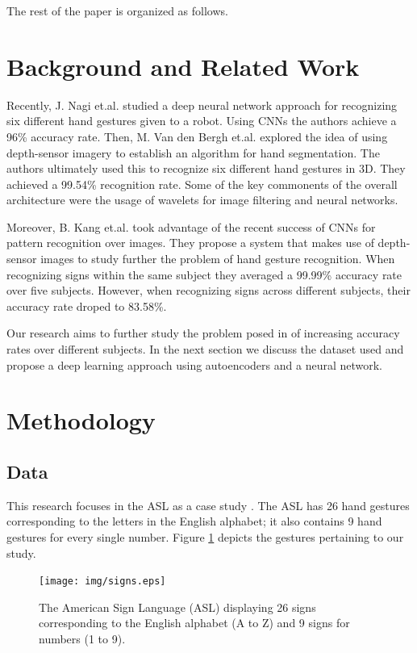 The rest of the paper is organized as follows. 


\section{Background and Related Work}

Recently, J. Nagi et.al. \cite{nagi2011max} studied a deep neural network
approach for recognizing six different hand gestures given to a robot. Using
CNNs the authors achieve a 96\% accuracy rate. Then, M. Van den Bergh et.al.
\cite{van2011combining} explored the idea of using depth-sensor imagery to
establish an algorithm for hand segmentation. The authors ultimately used this
to recognize six different hand gestures in 3D. They achieved a 99.54\%
recognition rate. Some of the key commonents of the overall architecture were
the usage of wavelets for image filtering and neural networks.

Moreover, B. Kang et.al. \cite{kang2015real} took advantage of the recent
success of CNNs for pattern recognition over images. They propose a system that
makes use of depth-sensor images to study further the problem of hand gesture
recognition. When recognizing signs within the same subject they averaged a 99.99\%
accuracy rate over five subjects. However, when recognizing signs across
different subjects, their accuracy rate droped to 83.58\%. 

Our research aims to further study the problem posed in \cite{kang2015real} of
increasing accuracy rates over different subjects. In the next section we
discuss the dataset used and propose a deep learning approach using
autoencoders and a neural network. 


\section{Methodology}

\subsection{Data}

This research focuses in the ASL as a case study \cite{baker1980american}. 
The ASL has 26 hand gestures 
corresponding to the letters in the English alphabet; it also contains 9 hand
gestures for every single number. Figure \ref{fig:asl} 
depicts the gestures pertaining to our study.

\begin{figure}
\centering
\texttt{[image: img/signs.eps]}
\caption{The American Sign Language (ASL) displaying 26 signs corresponding to the
English alphabet (A to Z) and 9 signs for numbers (1 to 9).}
\label{fig:asl}
\end{figure}

